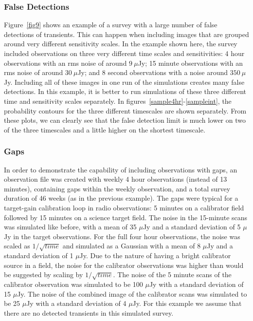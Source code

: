 \documentclass[12pt]{article}
\begin{document}
\subsubsection{False Detections}  \label{fddiscussion}
Figure~\ref{fig9} shows an example of a survey with a large number of false detections of transients. This can happen when including images that are grouped around very different sensitivity scales. In the example shown here, the survey included observations on three very different time scales and sensitivities: 4 hour observations with an rms noise of around $9~\mu$Jy; 15 minute observations with an rms noise of around $30~\mu$Jy; and 8 second observations with a noise around $350~\mu$Jy. Including all of these images in one run of the simulations creates many false detections. In this example, it is better to run simulations of these three different time and sensitivity scales separately. In figures~\ref{sample4hr}-\ref{sampleint}, the probability contours for the three different timescales are shown separately. From these plots, we can clearly see that the false detection limit is much lower on two of the three timescales and a little higher on the shortest timescale. 



\subsubsection{Gaps} \label{Gaps}
In order to demonstrate the capability of including observations with gaps, an observation file was created with weekly 4 hour observations (instead of 13 minutes), containing gaps within the weekly observation, and a total survey duration of 46 weeks (as in the previous example). The gaps were typical for a target-gain calibration loop in radio observations: 5 minutes on a calibrator field followed by 15 minutes on a science target field. The noise in the 15-minute scans was simulated like before, with a mean of 35 $\mu$Jy and a standard deviation of 5 $\mu$Jy in the target observations. For the full four hour observations, the noise was scaled as $1/\sqrt{time}$ and simulated as a Gaussian with a mean of 8 $\mu$Jy and a standard deviation of 1 $\mu$Jy. Due to the nature of having a bright calibrator source in a field, the noise for the calibrator observations was higher than would be suggested by scaling by $1/\sqrt{time}$. The noise of the 5 minute scans of the calibrator observation was simulated to be 100 $\mu$Jy with a standard deviation of 15 $\mu$Jy. The noise of the combined image of the calibrator scans was simulated to be 25 $\mu$Jy with a standard deviation of 4 $\mu$Jy. For this example we assume that there are no detected transients in this simulated survey.
\end{document}
